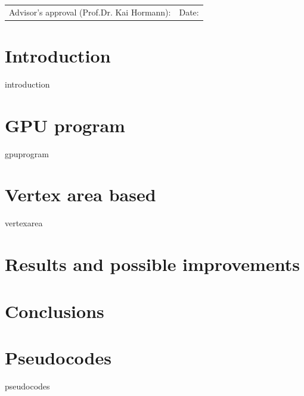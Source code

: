\documentclass[12pt]{article}
\theoremstyle{definition}
\theoremstyle{definition}
\theoremstyle{plain}
\theoremstyle{plain}
\theoremstyle{plain}
\theoremstyle{plain}
\theoremstyle{definition}
\theoremstyle{remark}
\theoremstyle{remark}
\theoremstyle{remark}
\theoremstyle{remark}
\newcommand{\ADVISOR}{Prof.Dr. Kai Hormann}
\begin{document}
\begin{small}
  \begin{tabular}{@{} p{} l @{}}
    Advisor's approval (\ADVISOR): & Date:
  \end{tabular}
\end{small}



\newpage \tableofcontents

\newpage \section{Introduction}
{introduction}

\newpage \section{GPU program}
{gpuprogram}

\newpage \section{Vertex area based}
{vertexarea}



\newpage \section{Results and possible improvements}

\newpage \section{Conclusions}

\newpage




\appendix
\newpage \section{Pseudocodes}
{pseudocodes}


\end{document}
